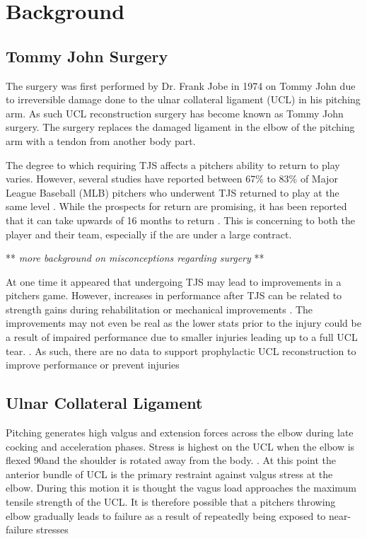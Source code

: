 \section {Background}

\subsection{Tommy John Surgery}

The surgery was first performed by Dr. Frank Jobe in 1974 on Tommy John due to irreversible damage done to the ulnar collateral ligament (UCL) in his pitching arm. As such UCL reconstruction surgery has become known as Tommy John surgery. The surgery replaces the damaged ligament in the elbow of the pitching arm with a tendon from another body part.

The degree to which requiring TJS affects a pitchers ability to return to play varies. However, several studies have reported between 67\% to 83\% of Major League Baseball (MLB) pitchers who underwent TJS returned to play at the same level \cite{Cain2010} \cite{Makhni2014} \cite{Erickson2014}. While the prospects for return are promising, it has been reported that it can take upwards of 16 months to return \cite{Makhni2014}. This is concerning to both the player and their team, especially if the are under a large contract.


** \emph{more background on misconceptions regarding surgery} **


At one time it appeared that undergoing TJS may lead to improvements in a pitchers game. However, increases in performance after TJS can be related to strength gains during rehabilitation or mechanical improvements \cite{Cain2010}. The improvements may not even be real as the lower stats prior to the injury could be a result of impaired performance due to smaller injuries leading up to a full UCL tear. \cite{Makhni2014}. As such, there are no data to support prophylactic UCL reconstruction to improve performance or prevent injuries \cite{Erickson2014}

\subsection{Ulnar Collateral Ligament}

Pitching generates high valgus and extension forces across the elbow during late cocking and acceleration phases. Stress is highest on the UCL when the elbow is flexed 90\degree and the shoulder is rotated away from the body. \cite{Fleisig2015}. At this point the anterior bundle of UCL is the primary restraint against valgus stress at the elbow. During this motion it is thought the vagus load approaches the maximum tensile strength of the UCL. It is therefore possible that a pitchers throwing elbow gradually leads to failure as a result of repeatedly being exposed to near-failure stresses \cite{Cain2010}

